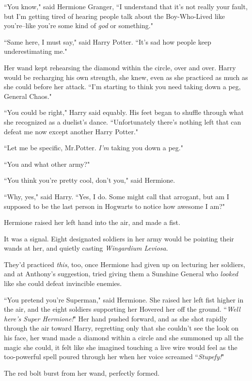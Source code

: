 ``You know," said Hermione Granger, ``I understand that it's not really your fault, but I'm getting tired of hearing people talk about the Boy-Who-Lived like you're\---like you're some kind of \emph{god} or something."

``Same here, I must say," said Harry Potter. ``It's sad how people keep underestimating me."

Her wand kept rehearsing the diamond within the circle, over and over. Harry would be recharging his own strength, she knew, even as she practiced as much as she could before her attack. ``I'm starting to think you need taking down a peg, General Chaos."

``You could be right," Harry said equably. His feet began to shuffle through what she recognized as a duelist's dance. ``Unfortunately there's nothing left that can defeat me now except another Harry Potter."

``Let me be specific, Mr.\?Potter. \emph{I'm} taking you down a peg."

``You and what other army?"

``You think you're pretty cool, don't you," said Hermione.

``Why, yes," said Harry. ``Yes, I do. Some might call that arrogant, but am I supposed to be the last person in Hogwarts to notice how awesome I am?"

Hermione raised her left hand into the air, and made a fist.

It was a signal. Eight designated soldiers in her army would be pointing their wands at her, and quietly casting \emph{Wingardium Leviosa}.

They'd practiced \emph{this}, too, once Hermione had given up on lecturing her soldiers, and at Anthony's suggestion, tried giving them a Sunshine General who \emph{looked} like she could defeat invincible enemies.

``You pretend you're Superman," said Hermione. She raised her left fist higher in the air, and the eight soldiers supporting her Hovered her off the ground. ``\emph{Well here's Super Hermione!}" Her hand pushed forward, and as she shot rapidly through the air toward Harry, regretting only that she couldn't see the look on his face, her wand made a diamond within a circle and she summoned up all the magic she could, it felt like she imagined touching a live wire would feel as the too-powerful spell poured through her when her voice screamed ``\emph{Stupefy!}"

The red bolt burst from her wand, perfectly formed.

